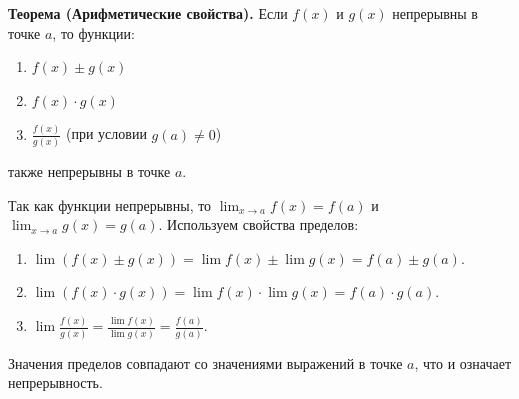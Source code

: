 \textbf{Теорема (Арифметические свойства).}
Если $f(x)$ и $g(x)$ непрерывны в точке $a$, то функции:
\begin{enumerate}
	\item $f(x) \pm g(x)$
	\item $f(x) \cdot g(x)$
	\item $\frac{f(x)}{g(x)}$ (при условии $g(a) \neq 0$)
\end{enumerate}
также непрерывны в точке $a$.

\begin{tcolorbox}[title=Доказательство]
	Так как функции непрерывны, то $\lim_{x\to a} f(x) = f(a)$ и $\lim_{x\to a} g(x) = g(a)$.
	Используем свойства пределов:
	\begin{enumerate}
		\item $\lim (f(x) \pm g(x)) = \lim f(x) \pm \lim g(x) = f(a) \pm g(a)$.
		\item $\lim (f(x) \cdot g(x)) = \lim f(x) \cdot \lim g(x) = f(a) \cdot g(a)$.
		\item $\lim \frac{f(x)}{g(x)} = \frac{\lim f(x)}{\lim g(x)} = \frac{f(a)}{g(a)}$.
	\end{enumerate}
	Значения пределов совпадают со значениями выражений в точке $a$, что и означает непрерывность.
\end{tcolorbox}

